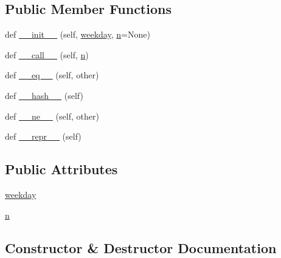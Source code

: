 \subsection*{Public Member Functions}
\begin{DoxyCompactItemize}
\item 
def \hyperlink{classdateutil_1_1__common_1_1weekday_aa5e0914c51ace705b92e1153d8989b6a}{\+\_\+\+\_\+init\+\_\+\+\_\+} (self, \hyperlink{classdateutil_1_1__common_1_1weekday}{weekday}, \hyperlink{classdateutil_1_1__common_1_1weekday_afc8255cecf49484808e4a59ef4ca5ff1}{n}=None)
\item 
def \hyperlink{classdateutil_1_1__common_1_1weekday_a58b8dc710d441f9b398910fea8ea0662}{\+\_\+\+\_\+call\+\_\+\+\_\+} (self, \hyperlink{classdateutil_1_1__common_1_1weekday_afc8255cecf49484808e4a59ef4ca5ff1}{n})
\item 
def \hyperlink{classdateutil_1_1__common_1_1weekday_ac6212b5b6fbb431c489303d746214128}{\+\_\+\+\_\+eq\+\_\+\+\_\+} (self, other)
\item 
def \hyperlink{classdateutil_1_1__common_1_1weekday_ac94359b2cc7b7e556d2e7147841eab57}{\+\_\+\+\_\+hash\+\_\+\+\_\+} (self)
\item 
def \hyperlink{classdateutil_1_1__common_1_1weekday_af47c5727fa2a91f8f596ce10b1a5ffc8}{\+\_\+\+\_\+ne\+\_\+\+\_\+} (self, other)
\item 
def \hyperlink{classdateutil_1_1__common_1_1weekday_a3cb8b2d5654da08e96a6be2ae0736a13}{\+\_\+\+\_\+repr\+\_\+\+\_\+} (self)
\end{DoxyCompactItemize}
\subsection*{Public Attributes}
\begin{DoxyCompactItemize}
\item 
\hyperlink{classdateutil_1_1__common_1_1weekday_ad2b395b1631608a908e09ad2158eb357}{weekday}
\item 
\hyperlink{classdateutil_1_1__common_1_1weekday_afc8255cecf49484808e4a59ef4ca5ff1}{n}
\end{DoxyCompactItemize}


\subsection{Constructor \& Destructor Documentation}
\mbox{\label{classdateutil_1_1__common_1_1weekday_aa5e0914c51ace705b92e1153d8989b6a}} 
